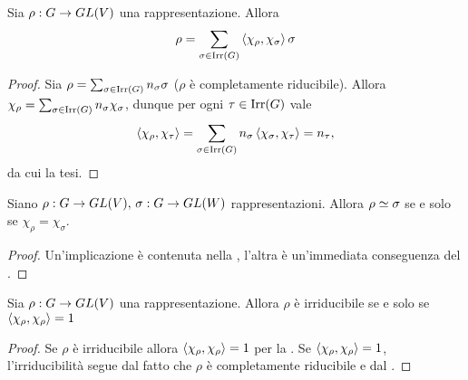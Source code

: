 \begin{corollary}
Sia $\rho:G\to GL(V)$ una rappresentazione. Allora
$$
\rho=\sum_{\sigma\in\operatorname{Irr}(G)}\left\langle\chi_\rho,\chi_\sigma\right\rangle\sigma
$$
\end{corollary}
\begin{proof}
Sia $\rho=\sum_{\sigma\in\operatorname{Irr}(G)}n_\sigma\sigma$ ($\rho$ è completamente riducibile). Allora $\chi_\rho=\sum_{\sigma\in\operatorname{Irr}(G)}n_\sigma\chi_\sigma$, dunque per ogni $\tau\in\operatorname{Irr}(G)$ vale
$$
\left\langle\chi_\rho,\chi_\tau\right\rangle=\sum_{\sigma\in\operatorname{Irr}(G)}n_\sigma\left\langle\chi_\sigma,\chi_\tau\right\rangle=n_\tau,
$$
da cui la tesi.
\end{proof}

\begin{corollary}
Siano $\rho:G\to GL(V),\,\allowbreak\sigma:G\to GL(W)$ rappresentazioni. Allora $\rho\simeq\sigma$ se e solo se $\chi_\rho=\chi_\sigma$.
\end{corollary}
\begin{proof}
Un'implicazione è contenuta nella , l'altra è un'immediata conseguenza del .
\end{proof}

\begin{corollary}
Sia $\rho:G\to GL(V)$ una rappresentazione. Allora $\rho$ è irriducibile se e solo se $\left\langle\chi_\rho,\chi_\rho\right\rangle=1$
\end{corollary}
\begin{proof}
Se $\rho$ è irriducibile allora $\left\langle\chi_\rho,\chi_\rho\right\rangle=1$ per la . Se $\left\langle\chi_\rho,\chi_\rho\right\rangle=1$, l'irriducibilità segue dal fatto che $\rho$ è completamente riducibile e dal .
\end{proof}

